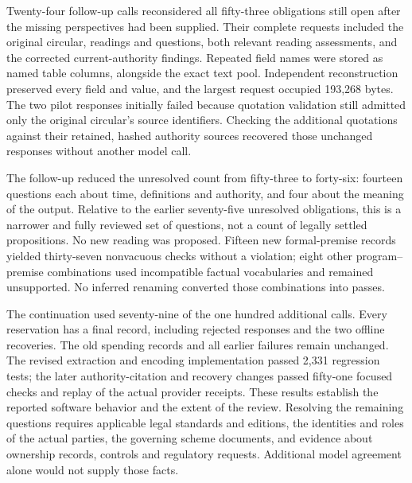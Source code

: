 Twenty-four follow-up calls reconsidered all fifty-three obligations still open
after the missing perspectives had been supplied. Their complete requests
included the original circular, readings and questions, both relevant reading
assessments, and the corrected current-authority findings. Repeated field names
were stored as named table columns, alongside the exact text pool. Independent
reconstruction preserved every field and value, and the largest request occupied
193,268 bytes. The two pilot responses initially failed because quotation
validation still admitted only the original circular's source identifiers.
Checking the additional quotations against their retained, hashed authority
sources recovered those unchanged responses without another model call.

The follow-up reduced the unresolved count from fifty-three to forty-six:
fourteen questions each about time, definitions and authority, and four about
the meaning of the output. Relative to the earlier seventy-five unresolved
obligations, this is a narrower and fully reviewed set of questions, not a count
of legally settled propositions. No new reading was proposed. Fifteen new
formal-premise records yielded thirty-seven nonvacuous checks without a
violation; eight other program--premise combinations used incompatible factual
vocabularies and remained unsupported. No inferred renaming converted those
combinations into passes.

The continuation used seventy-nine of the one hundred additional calls.
Every reservation has a final record, including rejected responses and the two
offline recoveries. The old spending records and all earlier failures remain
unchanged. The revised extraction and encoding implementation passed 2,331
regression tests; the later authority-citation and recovery changes passed
fifty-one focused checks and replay of the actual provider receipts. These
results establish the reported software behavior and the extent of the review.
Resolving the remaining questions requires applicable legal standards and
editions, the identities and roles of the actual parties, the governing scheme
documents, and evidence about ownership records, controls and regulatory
requests. Additional model agreement alone would not supply those facts.
